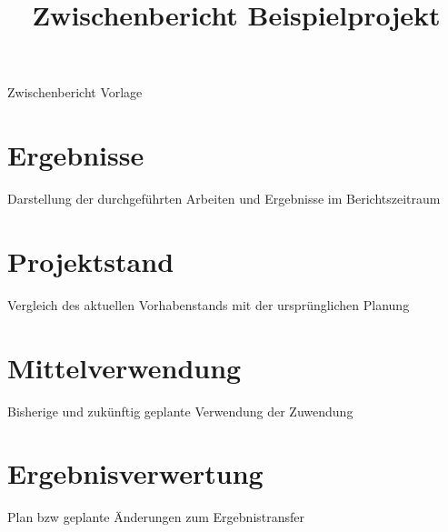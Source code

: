 \title{Zwischenbericht Beispielprojekt}



\makecoverpages

\maketableofcontents

\begin{Panel}[anchor=top-right, x=1cm, y=5cm, width=5.5cm]
  Zwischenbericht Vorlage
\end{Panel}


\part{Ergebnisse}
Darstellung der durchgeführten Arbeiten und Ergebnisse im Berichtszeitraum

\part{Projektstand}
Vergleich des aktuellen Vorhabenstands mit der ursprünglichen Planung

\part{Mittelverwendung}
Bisherige und zukünftig geplante Verwendung der Zuwendung

\part{Ergebnisverwertung}
Plan bzw geplante Änderungen zum Ergebnistransfer

\makeappendices
{}


